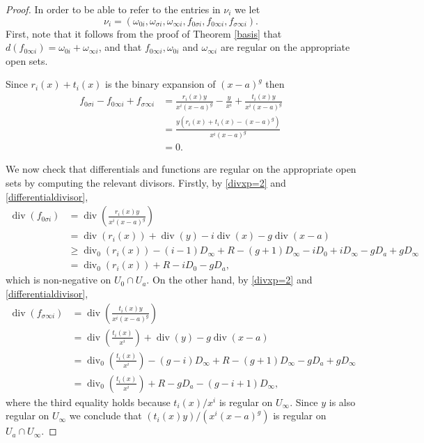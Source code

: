 \documentclass[draft, 11pt]{article} %
\theoremstyle{plain}
\theoremstyle{remark}
\DeclareMathOperator{\di}{div}
\begin{document}
\begin{proof}
In order to be able to refer to the entries in $\nu_i$ we let
\[
\nu_i = \left( \omega_{0 i}, \omega_{\sigma i}, \omega_{\infty i}, f_{0 \sigma i}, f_{0 \infty i}, f_{\sigma \infty i} \right).
\]
First, note that it follows from the proof of Theorem \ref{basis} that $d(f_{0 \infty i}) = \omega_{0 i} + \omega_{\infty i}$, and that $f_{0 \infty i}, \omega_{0 i}$ and $\omega_{\infty i}$ are regular on the appropriate open sets.

Since $r_i(x)+t_i(x)$ is the binary expansion of $(x-a)^g$ then
\begin{align*}
f_{0 \sigma i} - f_{0 \infty i}+ f_{\sigma \infty i} & = \frac{r_i(x)y}{x^i(x-a)^g} - \frac{y}{x^i} + \frac{t_i(x)y}{x^i(x-a)^g} \\
& = \frac{y(r_i(x) + t_i(x) - (x-a)^g)}{x^i(x-a)^g} \\
& = 0.
\end{align*}



We now check that differentials and functions are regular on the appropriate open sets by computing the relevant divisors.
Firstly, by \eqref{divxp=2} and \eqref{differentialdivisor},
\begin{align*}
\di \left( f_{0 \sigma i} \right) & = \di \left( \frac{r_i(x)y}{x^i(x-a)^g} \right) \\
&  = \di(r_i(x)) + \di(y) - i\di(x) - g\di(x-a) \\
& \geq \di_0(r_i(x)) - (i-1)D_\infty +R - (g+1)D_\infty - iD_0 + iD_\infty - gD_a + gD_\infty \\
& = \di_0(r_i(x)) +R -iD_0 - gD_a,
\end{align*}
which is non-negative on $U_0 \cap U_a$.
On the other hand, by \eqref{divxp=2} and \eqref{differentialdivisor},
\begin{align*}
\di \left( f_{\sigma \infty i} \right) & = \di \left( \frac{t_i(x)y}{x^i(x-a)^g} \right) \\
& = \di\left(\frac{t_i(x)}{x^i}\right) + \di(y) - g\di(x-a) \\
& = \di_0 \left( \frac{t_i(x)}{x^i} \right) - (g-i)D_\infty +R - (g+1)D_\infty - gD_a + gD_\infty\\
& = \di_0 \left( \frac{t_i(x)}{x^i} \right) +R - gD_a -(g-i+1)D_\infty,
\end{align*}
where the third equality holds because $t_i(x)/x^i$ is regular on $U_\infty$.
Since $y$ is also regular on $U_\infty$  we conclude that $({t_i(x)y})/({x^i(x-a)^g})$ is regular on $U_a \cap U_\infty$.


\end{proof}
\end{document}
